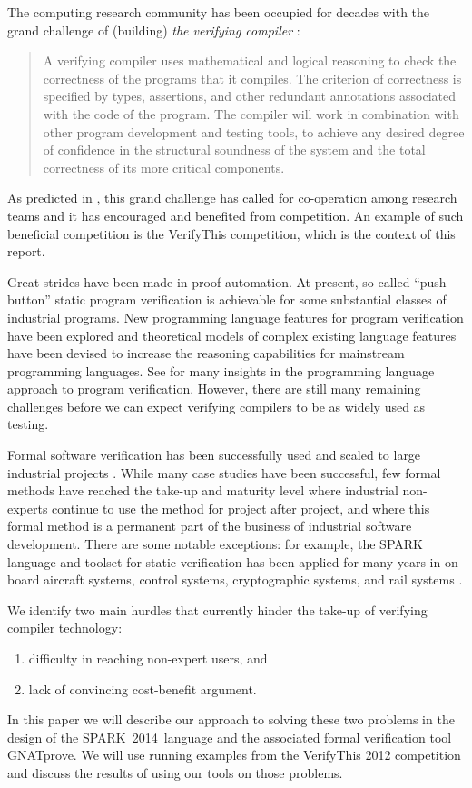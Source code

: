 \documentclass[sttt,final]{svjour}
\newcommand{\gnatprove}{GNATprove\xspace}
\newcommand{\newspark}{SPARK~2014\xspace}
\begin{document}
The computing research community has been occupied for decades with
the grand challenge of (building) \emph{the verifying compiler}
\cite{Hoare03theverifying}:
%
\begin{quote} A verifying compiler uses mathematical and logical reasoning
  to check the correctness of the programs that it compiles. The
  criterion of correctness is specified by types, assertions, and
  other redundant annotations associated with the code of the
  program. The compiler will work in combination with other program
  development and testing tools, to achieve any desired degree of
  confidence in the structural soundness of the system and the total
  correctness of its more critical components.
\end{quote}

As predicted in \cite{Hoare03theverifying}, this grand challenge has
called for co-operation among research teams and it has encouraged
and benefited from competition. An example of such beneficial
competition is the VerifyThis competition, which is the context of
this report.

Great strides have been made in proof automation. At present,
so-called ``push-button'' static program verification is achievable for some
substantial classes of industrial programs. New programming language
features for program verification have been explored and theoretical
models of complex existing language features have been devised to
increase the reasoning capabilities for mainstream programming
languages. See \cite{HatcliffLLMP12} for many insights in the
programming language approach to program verification. However, there
are still many remaining challenges before we can expect verifying
compilers to be as widely used as testing.

Formal software verification has been successfully used and scaled to
large industrial projects \cite{Woodcock2009,vcc2009}. While many case
studies have been successful, few formal methods have reached the
take-up and maturity level where industrial non-experts continue to
use the method for project after project, and where this formal
method is a permanent part of the business of industrial software
development. There are some notable exceptions: for example, the SPARK
language and toolset for static verification has been applied for many
years in on-board aircraft systems, control systems, cryptographic
systems, and rail systems \cite{sparkbook2012,oneill2012}.

We identify two main hurdles that currently hinder the
take-up of verifying compiler technology:
%
\begin{enumerate}
\item difficulty in reaching non-expert users, and
\item lack of convincing cost-benefit argument.
\end{enumerate}
%
In this paper we will describe our approach to solving these two
problems in the design of the \newspark\ language and the associated
formal verification tool \gnatprove. We will use running examples from
the VerifyThis 2012 competition and discuss the results of using our
tools on those problems.
\end{document}
